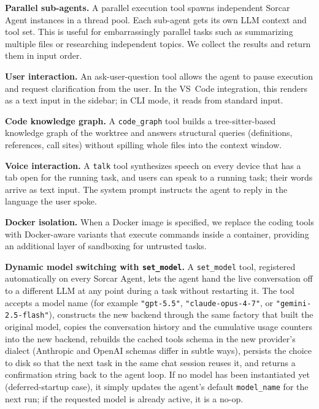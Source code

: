 \documentclass{article}
\begin{document}
\textbf{Parallel sub-agents.}  A parallel execution tool spawns independent Sorcar Agent instances in a thread pool.  Each sub-agent gets its own LLM context and tool set.  This is useful for embarrassingly parallel tasks such as summarizing multiple files or researching independent topics.  We collect the results and return them in input order.  

\textbf{User interaction.}  An ask-user-question tool allows the agent to pause execution and request clarification from the user.  In the VS~Code integration, this renders as a text input in the sidebar; in CLI mode, it reads from standard input.

\textbf{Code knowledge graph.}  A \texttt{code\_graph} tool builds a tree-sitter-based knowledge graph of the worktree and answers structural queries (definitions, references, call sites) without spilling whole files into the context window.

\textbf{Voice interaction.}  A \texttt{talk} tool synthesizes speech on every device that has a tab open for the running task, and users can speak to a running task; their words arrive as text input.  The system prompt instructs the agent to reply in the language the user spoke.

\textbf{Docker isolation.}  When a Docker image is specified, we replace the coding tools with Docker-aware variants that execute commands inside a container, providing an additional layer of sandboxing for untrusted tasks.

\textbf{Dynamic model switching with \texttt{set\_model}.}  A \texttt{set\_model} tool, registered automatically on every Sorcar Agent, lets the agent hand the live conversation off to a different LLM at any point during a task without restarting it.  The tool accepts a model name (for example \texttt{"gpt-5.5"}, \texttt{"claude-opus-4-7"}, or \texttt{"gemini-2.5-flash"}), constructs the new backend through the same factory that built the original model, copies the conversation history and the cumulative usage counters into the new backend, rebuilds the cached tools schema in the new provider's dialect (Anthropic and OpenAI schemas differ in subtle ways), persists the choice to disk so that the next task in the same chat session reuses it, and returns a confirmation string back to the agent loop.  If no model has been instantiated yet (deferred-startup case), it simply updates the agent's default \texttt{model\_name} for the next run; if the requested model is already active, it is a no-op.
\end{document}
